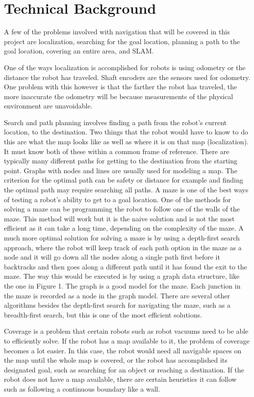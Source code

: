 \documentclass[10pt,twocolumn]{article}
\begin{document}
\section{Technical Background}

A few of the problems involved with navigation that will be covered in this project are localization, searching for the goal location, planning a path to the goal location, covering an entire area, and SLAM.

One of the ways localization is accomplished for robots is using odometry or the distance the robot has traveled. Shaft encoders are the sensors used for odometry. One problem with this however is that the farther the robot has traveled, the more inaccurate the odometry will be because measurements of the physical environment are unavoidable.

Search and path planning involves finding a path from the robot’s current location, to the destination. Two things that the robot would have to know to do this are what the map looks like as well as where it is on that map (localization). It must know both of these within a common frame of reference. There are typically many different paths for getting to the destination from the starting point. Graphs with nodes and lines are usually used for modeling a map. The criterion for the optimal path can be safety or distance for example and finding the optimal path may require searching all paths. A maze is one of the best ways of testing a robot’s ability to get to a goal location. One of the methods for solving a maze can be programming the robot to follow one of the walls of the maze. This method will work but it is the naive solution and is not the most efficient as it can take a long time, depending on the complexity of the maze. A much more optimal solution for solving a maze is by using a depth-first search approach, where the robot will keep track of each path option in the maze as a node and it will go down all the nodes along a single path first before it backtracks and then goes along a different path until it has found the exit to the maze. The way this would be executed is by using a graph data structure, like the one in Figure 1. The graph is a good model for the maze. Each junction in the maze is recorded as a node in the graph model. There are several other algorithms besides the depth-first search for navigating the maze, such as a breadth-first search, but this is one of the most efficient solutions.

Coverage is a problem that certain robots such as robot vacuums need to be able to efficiently solve. If the robot has a map available to it, the problem of coverage becomes a lot easier. In this case, the robot would need all navigable spaces on the map until the whole map is covered, or the robot has accomplished its designated goal, such as searching for an object or reaching a destination. If the robot does not have a map available, there are certain heuristics it can follow such as following a continuous boundary like a wall. 
\end{document}
